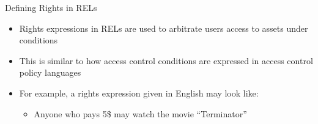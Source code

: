 \documentclass{beamer}
\begin{document}
\begin{frame}[fragile]{Defining Rights in RELs}
\begin{itemize}
\item Rights expressions in RELs are used to arbitrate users access to assets under conditions
\item This is similar to how access control conditions are expressed in access control policy languages
\item For example, a rights expression given in English may look like:
   \begin{itemize}
   \item Anyone who pays 5\$ may watch the movie ``Terminator''
   \end{itemize}
\end{itemize}
\end{frame}
\end{document}
